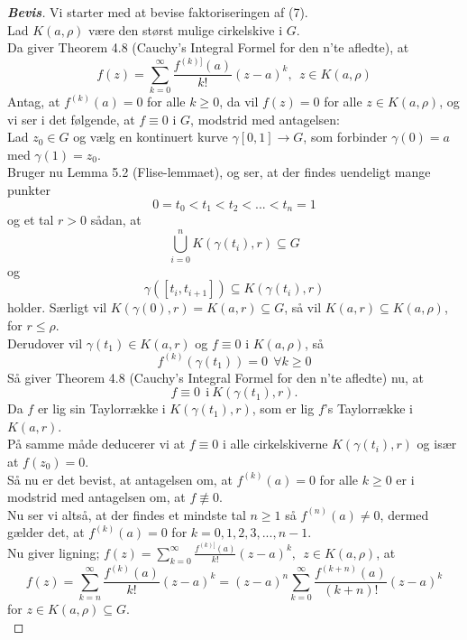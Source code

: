 \documentclass[10pt,a4paper]{article}
\theoremstyle{definition}
\begin{document}
\newpage
\begin{proof}[\textbf{Bevis}] 
Vi starter med at bevise faktoriseringen af (7). \\
Lad $K(a,\rho)$ være den størst mulige cirkelskive i $G$. \\
Da giver Theorem 4.8 (Cauchy's Integral Formel for den n'te afledte), at
$$f(z) = \sum\limits_{k=0}^\infty \frac{f^{(k)]}(a)}{k!}(z-a)^k, \ \ z \in K(a,\rho)$$
Antag, at $f^{(k)}(a)=0$ for alle $k \geq 0$, da vil $f(z)=0$ for alle $z \in K(a,\rho)$, og vi ser i det følgende, at $f \equiv 0$ i $G$, modstrid med antagelsen: \\

Lad $z_0 \in G$ og vælg en kontinuert kurve $\gamma[0,1] \rightarrow G$, som forbinder $\gamma (0)=a $ med $\gamma(1)=z_0$. \\
Bruger nu Lemma 5.2 (Flise-lemmaet), og ser, at der findes uendeligt mange punkter
$$0 = t_0 < t_1 < t_2 < ... < t_n = 1$$
og et tal $r>0$ sådan, at 
$$\bigcup_{i=0}^n K(\gamma(t_i),r) \subseteq G$$
og
$$\gamma([t_i,t_{i+1}]) \subseteq K(\gamma(t_i),r)$$
holder. Særligt vil $K(\gamma(0),r)=K(a,r) \subseteq G$, så vil $K(a,r) \subseteq K(a,\rho)$, for $r \leq \rho$. \\
Derudover vil $\gamma(t_1) \in K(a,r)$ og $f \equiv 0$ i $K(a,\rho)$, så
$$f^{(k)}(\gamma(t_1)) = 0 \ \ \forall k \geq 0$$
Så giver Theorem 4.8 (Cauchy's Integral Formel for den n'te afledte) nu, at
$$f \equiv 0 \ \ \text{i} \ K(\gamma(t_1),r).$$
Da $f$ er lig sin Taylorrække i $K(\gamma(t_1),r)$, som er lig $f$'s Taylorrække i $K(a,r)$. \\
På samme måde deducerer vi at $f \equiv 0$ i alle cirkelskiverne $K(\gamma(t_i),r)$ og især at $f(z_0) = 0$. \\
Så nu er det bevist, at antagelsen om, at $f^{(k)}(a)=0$ for alle $k \geq 0$ er i modstrid med antagelsen om, at $f \not\equiv 0$. \\

Nu ser vi altså, at der findes et mindste tal $n \geq 1$ så $f^{(n)}(a) \neq 0$, dermed gælder det, at $f^{(k)}(a)=0$ for $k=0,1,2,3,...,n-1$. \\

Nu giver ligning; $f(z) = \sum\limits_{k=0}^\infty \frac{f^{(k)]}(a)}{k!}(z-a)^k, \ \ z \in K(a,\rho)$, at
\begin{equation}
f(z) = \sum\limits_{k=n}^\infty \frac{f^{(k)}(a)}{k!}(z-a)^k = (z-a)^n \sum\limits_{k=0}^\infty \frac{f^{(k+n)}(a)}{(k+n)!} (z-a)^k
\end{equation}
for $z \in K(a,\rho) \subseteq G$. \\


\end{proof}
\end{document}
